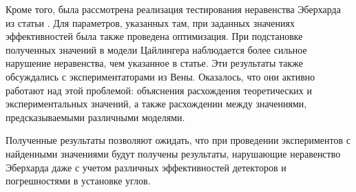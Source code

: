 \documentclass[%
master,         %
subf,           %
href,           %
,times         %
]{disser}
\numberwithin{equation}{section}
\numberwithin{figure}{section}
\begin{document}
Кроме того, была рассмотрена реализация тестирования неравенства Эберхарда из статьи \cite{Zeilinger}. Для параметров, указанных там, при заданных значениях эффективностей была также проведена оптимизация. При подстановке полученных значений в модели Цайлингера наблюдается более сильное нарушение неравенства, чем указанное в статье. Эти результаты также обсуждались с экспериментаторами из Вены. Оказалось, что они активно работают над этой проблемой: объяснения расхождения теоретических и экспериментальных значений, а также расхождении между значениями, предсказываемыми различными моделями.

Полученные результаты позволяют ожидать, что при проведении экспериментов с найденными значениями будут получены результаты, нарушающие неравенство Эберхарда даже с учетом различных эффективностей детекторов и погрешностями в установке углов.



%
\end{document}
